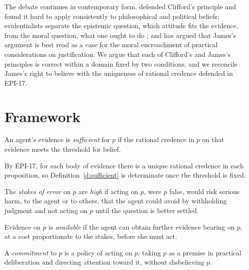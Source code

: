 \documentclass{situationist-preprint}
\begin{document}
The debate continues in contemporary form. \citet{vanInwagen1996} defended Clifford's principle and found it hard to apply consistently to philosophical and political beliefs; evidentialists separate the epistemic question, which attitude fits the evidence, from the moral question, what one ought to do \citep{ConeeFeldman1985}; and \citet{Pace2011} has argued that James's argument is best read as a case for the moral encroachment of practical considerations on justification. We argue that each of Clifford's and James's principles is correct within a domain fixed by two conditions, and we reconcile James's right to believe with the uniqueness of rational credence defended in EPI-17.

\section{Framework}

\begin{definition}\label{d:sufficient}
An agent's evidence is \emph{sufficient} for $p$ if the rational credence in $p$ on that evidence meets the threshold for belief.
\end{definition}

By EPI-17, for each body of evidence there is a unique rational credence in each proposition, so Definition~\ref{d:sufficient} is determinate once the threshold is fixed.

\begin{definition}\label{d:stakes}
The \emph{stakes of error} on $p$ are \emph{high} if acting on $p$, were $p$ false, would risk serious harm, to the agent or to others, that the agent could avoid by withholding judgment and not acting on $p$ until the question is better settled.
\end{definition}

\begin{definition}\label{d:available}
Evidence on $p$ is \emph{available} if the agent can obtain further evidence bearing on $p$, at a cost proportionate to the stakes, before she must act.
\end{definition}

\begin{definition}[Commitment]\label{d:commit}
A \emph{commitment} to $p$ is a policy of acting on $p$, taking $p$ as a premise in practical deliberation and directing attention toward it, without disbelieving $p$.
\end{definition}
\end{document}

